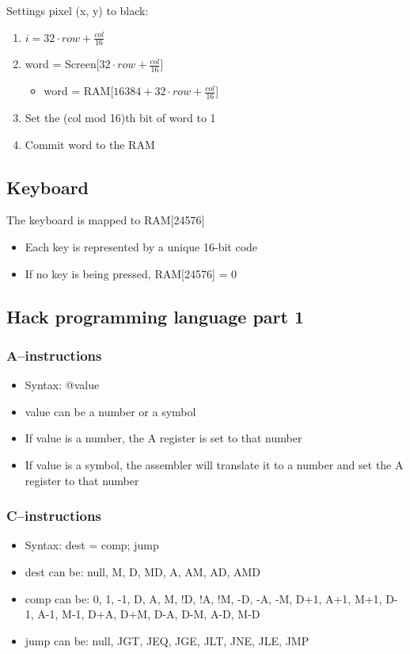 \documentclass[12pt,a4paper]{article}
\begin{document}
Settings pixel (x, y) to black:
\begin{enumerate}
    \item $i = 32 \cdot row + \frac{col}{16}$
    \item word = Screen[$32 \cdot row + \frac{col}{16}$]
    \begin{itemize}
        \item word = RAM[$16384 + 32 \cdot row + \frac{col}{16}$]
    \end{itemize}
    \item Set the (col mod 16)th bit of word to 1
    \item Commit word to the RAM
\end{enumerate}

\subsection{Keyboard}
The keyboard is mapped to RAM[24576] 
\begin{itemize}
    \item Each key is represented by a unique 16-bit code
    \item If no key is being pressed, RAM[24576] = 0
\end{itemize}

\subsection{Hack programming language part 1}
\subsubsection{A--instructions}
\begin{itemize}
    \item Syntax: @value
    \item value can be a number or a symbol
    \item If value is a number, the A register is set to that number
    \item If value is a symbol, the assembler will translate it to a number and set the A register to that number
\end{itemize}

\subsubsection{C--instructions}
\begin{itemize}
    \item Syntax: dest = comp; jump
    \item dest can be: null, M, D, MD, A, AM, AD, AMD
    \item comp can be: 0, 1, -1, D, A, M, !D, !A, !M, -D, -A, -M, D+1, A+1, M+1, D-1, A-1, M-1, D+A, D+M, D-A, D-M, A-D, M-D
    \item jump can be: null, JGT, JEQ, JGE, JLT, JNE, JLE, JMP
\end{itemize}
\end{document}
